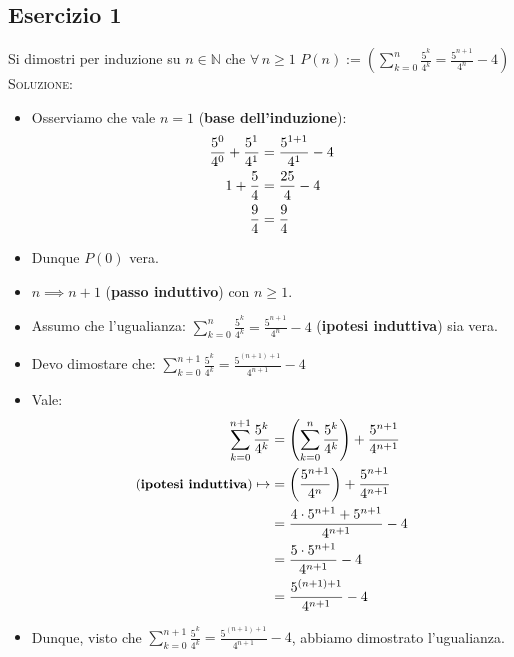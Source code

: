 \documentclass[10pt]{article}
\begin{document}
	\subsection{Esercizio 1}
	Si dimostri per induzione su $n \!\in\! \mathbb{N}$ che $\forall \, n \!\geq\! 1$ $P(n) := \displaystyle{\left(\sum_{k=0}^n \frac{5^k}{4^k} = \frac{5^{n+1}}{4^n} - 4 \right)}$
	\\ \textsc{Soluzione:}
	\begin{itemize}
	\item
	Osserviamo che vale $n=1$ (\textbf{base dell'induzione}):
	\begin{equation}
	\begin{split}
	\displaystyle{\frac{5^0}{4^0} + \frac{5^1}{4^1}} &= \displaystyle{\frac{5^{1+1}}{4^1} - 4} \\
	\displaystyle{1 + \frac{5}{4}} &= \displaystyle{\frac{25}{4} - 4}\\
	\displaystyle{\frac{9}{4}} &= \displaystyle{\frac{9}{4}}
	\notag
	\end{split}
	\end{equation}
	\item
	Dunque $P(0)$  vera.
	\item
	$n \implies n + 1$ (\textbf{passo induttivo}) con $n \!\geq\! 1$.
	\item
	Assumo che l'ugualianza: $\displaystyle{\sum_{k=0}^n \frac{5^k}{4^k} = \frac{5^{n+1}}{4^n} - 4}$ (\textbf{ipotesi induttiva}) sia vera.
	\item
	Devo dimostare che: $\displaystyle{\sum_{k=0}^{n+1} \frac{5^k}{4^k} = \frac{5^{(n+1)+1}}{4^{n+1}} - 4}$
	\item
	Vale:
	\begin{equation}
	\begin{split}
	\displaystyle{\sum_{k=0}^{n+1} \frac{5^k}{4^k}} &= \displaystyle{\left(\sum_{k=0}^{n} \frac{5^k}{4^k}\right) + \frac{5^{n+1}}{4^{n+1}}} \\
	\textrm{\small{(\textbf{ipotesi induttiva})}} \mapsto &= \displaystyle{\left(\frac{5^{n+1}}{4^{n}}\right) + \frac{5^{n+1}}{4^{n+1}}} \\
	&= \displaystyle{\frac{4 \cdot 5^{n+1} + 5^{n+1}}{4^{n+1}} -4} \\		
	&= \displaystyle{\frac{5 \cdot 5^{n+1}}{4^{n+1}}-4} \\		
	&= \displaystyle{\frac{5^{(n+1)+1}}{4^{n+1}}-4}
	\notag
	\end{split}
	\end{equation}
	\item
	Dunque, visto che $\displaystyle{\sum_{k=0}^{n+1} \frac{5^k}{4^k} =\frac{5^{(n+1)+1}}{4^{n+1}}-4}$, abbiamo dimostrato l'ugualianza.
	\end{itemize}
	\newpage
	
\end{document}
